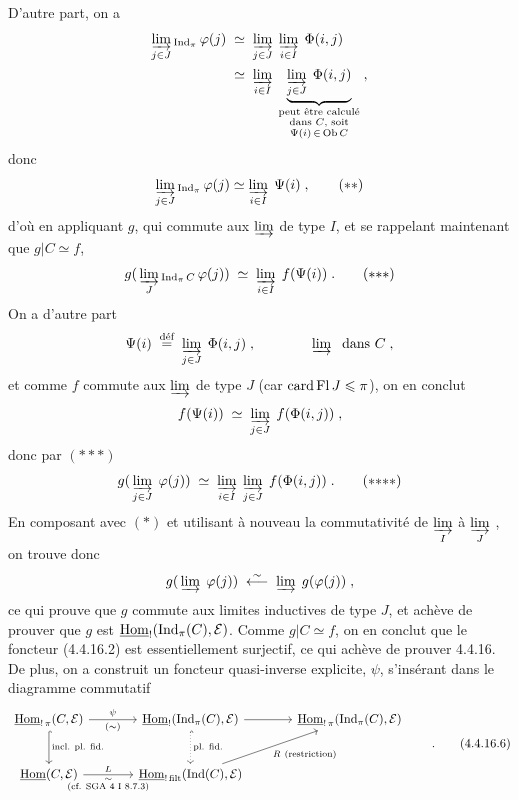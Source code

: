 D'autre part, on a
\[
\begin{aligned}
\varinjlim_{j\in J}{}_{\operatorname{Ind}_\pi}\,\varphi(j)\;&\simeq\;\varinjlim_{j\in J}\;\varinjlim_{i\in I}\;\Phi(i,j)\\
&\simeq\;\varinjlim_{i\in I}\;\underbrace{\varinjlim_{j\in J}\;\Phi(i,j)}_{\substack{\text{peut être calculé}\\ \text{dans $C$, soit}\\ \Psi(i)\,\in\,\mathrm{Ob}\, C}}\;,
\end{aligned}
\]
donc
\[
\varinjlim_{j\in J}{}_{\operatorname{Ind}_\pi}\,\varphi(j)\simeq\varinjlim_{i\in I}\;\Psi(i)\;, \tag*{$(**)$}
\]
d'où en appliquant $g$, qui commute aux $\varinjlim$ de type $I$, et se rappelant maintenant que $g|C\simeq f$,
\[
g(\,\varinjlim_{J}{}_{\Ind_\pi C}\,\varphi(j))\;\simeq\;\varinjlim_{i\in I}\;f(\Psi(i))\;. \tag*{$(*{*}*)$}
\]
On a d'autre part
\[
\Psi(i)\;\overset{\text{déf}}{=}\;\varinjlim_{j\in J}\;\Phi(i,j)\;,\qquad\qquad \varinjlim\;\text{ dans } C\;,
\]
et comme $f$ commute aux $\varinjlim$ de type $J$ (car $\operatorname{card}\operatorname{Fl} J\leqslant\pi$), on en conclut
\[
f(\Psi(i))\;\simeq\;\varinjlim_{j\in J}\;f(\Phi(i,j))\;,
\]
donc par $(*{*}*)$
\[
g(\,\varinjlim_{j\in J}\;\varphi(j))\;\simeq\;\varinjlim_{i\in I}\;\varinjlim_{j\in J}\;f(\Phi(i,j))\;. \tag*{$(*{*}{*}*)$}
\]
En composant avec $(*)$ et utilisant à nouveau la commutativité de $\varinjlim\limits_{I}$ à $\varinjlim\limits_{J}$ , on trouve donc
\[
g(\,\varinjlim\;\varphi(j))\;\overset{\sim}{\longleftarrow}\;\varinjlim\;g(\varphi(j))\;,
\]
ce qui prouve que $g$ commute aux limites inductives de type $J$, et achève de prouver que $g$ est $\underline{\mathrm{Hom}}_{!}(\operatorname{Ind}_\pi(C),\mathcal{E})$. Comme $g|C\simeq f$, on en conclut que le foncteur (4.4.16.2) est essentiellement surjectif, ce qui achève de prouver 4.4.16. De plus, on a construit un foncteur quasi-inverse explicite, $\psi$,
s'insérant dans le diagramme commutatif
\[
\begin{tikzcd}[column sep=large, row sep=large]
\uHom_{!\,\pi}(C,\mathcal{E}) \arrow[r, "\psi", "(\sim)"'] \arrow[d, hook, "\text{incl. pl. fid.}"] & \uHom_{!}(\Ind_\pi(C),\mathcal{E}) \arrow[r] \arrow[d, hook, dotted, "\text{pl. fid.}"] & \uHom_{!\,\pi}(\Ind_\pi(C),\mathcal{E}) \\
\uHom(C,\mathcal{E}) \arrow[r, "L", "\substack{\sim\\ \text{(cf. SGA 4 I 8.7.3)}}"'] & \uHom_{!\,\mathrm{filt}}(\Ind(C),\mathcal{E}) \arrow[ur, "R\ \text{(restriction)}"'] &
\end{tikzcd}
\qquad.
\tag*{(4.4.16.6)} %
\]

